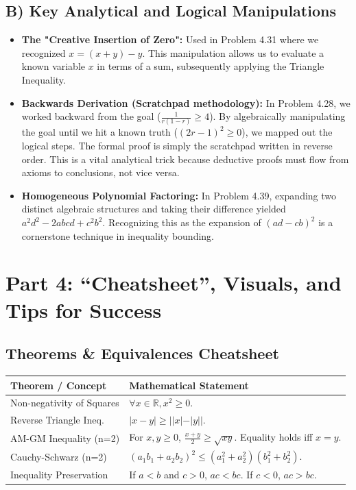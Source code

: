 \documentclass[11pt]{article}
\theoremstyle{definition}
\theoremstyle{remark}
\begin{document}
\begin{itemize}
\subsection{B) Key Analytical and Logical Manipulations}
\begin{itemize}
    \item \textbf{The "Creative Insertion of Zero":} Used in Problem 4.31 where we recognized $x = (x + y) - y$. This manipulation allows us to evaluate a known variable $x$ in terms of a sum, subsequently applying the Triangle Inequality.
    \item \textbf{Backwards Derivation (Scratchpad methodology):} In Problem 4.28, we worked backward from the goal ($\frac{1}{r(1-r)} \ge 4$). By algebraically manipulating the goal until we hit a known truth ($(2r-1)^2 \ge 0$), we mapped out the logical steps. The formal proof is simply the scratchpad written in reverse order. This is a vital analytical trick because deductive proofs must flow from axioms to conclusions, not vice versa.
    \item \textbf{Homogeneous Polynomial Factoring:} In Problem 4.39, expanding two distinct algebraic structures and taking their difference yielded $a^2d^2 - 2abcd + c^2b^2$. Recognizing this as the expansion of $(ad - cb)^2$ is a cornerstone technique in inequality bounding.
\end{itemize}


\newpage
\section{Part 4: ``Cheatsheet'', Visuals, and Tips for Success}

\subsection{Theorems \& Equivalences Cheatsheet}
\begin{table}[h]
\centering
\renewcommand{\arraystretch}{1.5}
\begin{tabular}{|l|p{10cm}|}
\hline
\textbf{Theorem / Concept} & \textbf{Mathematical Statement} \\
\hline
Non-negativity of Squares & $\forall x \in \mathbb{R}, x^2 \ge 0$. \\
\hline
Reverse Triangle Ineq. & $|x - y| \ge | |x| - |y| |$. \\
\hline
AM-GM Inequality (n=2) & For $x,y \ge 0$, $\frac{x+y}{2} \ge \sqrt{xy}$. Equality holds iff $x=y$. \\
\hline
Cauchy-Schwarz (n=2) & $(a_1b_1 + a_2b_2)^2 \le (a_1^2 + a_2^2)(b_1^2 + b_2^2)$. \\
\hline
Inequality Preservation & If $a < b$ and $c > 0$, $ac < bc$. If $c < 0$, $ac > bc$. \\
\hline
\end{tabular}
\end{table}


\end{itemize}
\end{document}

